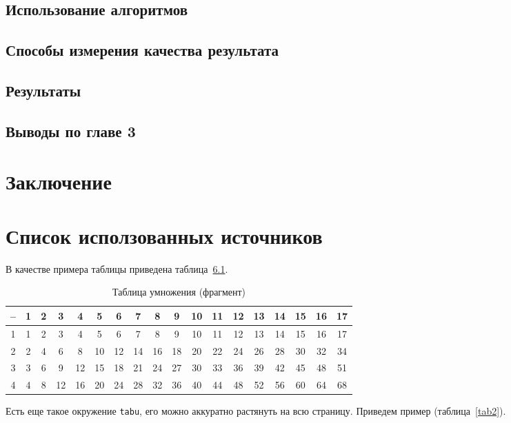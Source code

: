 \documentclass[annotation,times,page4]{itmo-student-thesis}
\begin{document}
\section{Использование алгоритмов}
\section{Способы измерения качества результата}
\section{Результаты}
\section{Выводы по главе 3}

\chapter{Заключение}
\chapter{Список исползованных источников}



В качестве примера таблицы приведена таблица~\ref{tab1}.

\begin{table}[!h]
\caption{Таблица умножения (фрагмент)}\label{tab1}
\centering
\begin{tabular}{|*{18}{c|}}\hline
-- & 1 & 2 & 3 & 4 & 5 & 6 & 7 & 8 & 9 & 10 & 11 & 12 & 13 & 14 & 15 & 16 & 17 \\\hline
1  & 1 & 2 & 3 & 4 & 5 & 6 & 7 & 8 & 9 & 10 & 11 & 12 & 13 & 14 & 15 & 16 & 17 \\\hline
2  & 2 & 4 & 6 & 8 & 10 & 12 & 14 & 16 & 18 & 20 & 22 & 24 & 26 & 28 & 30 & 32 & 34 \\\hline
3  & 3 & 6 & 9 & 12 & 15 & 18 & 21 & 24 & 27 & 30 & 33 & 36 & 39 & 42 & 45 & 48 & 51 \\\hline
4  & 4 & 8 & 12 & 16 & 20 & 24 & 28 & 32 & 36 & 40 & 44 & 48 & 52 & 56 & 60 & 64 & 68 \\\hline
\end{tabular}
\end{table}

Есть еще такое окружение \texttt{tabu}, его можно аккуратно растянуть на всю страницу.
Приведем пример (таблица~\ref{tab2}).
\end{document}
